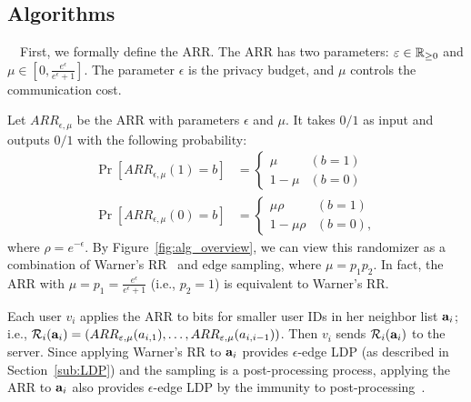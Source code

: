 \subsection{Algorithms}
\label{sub:three_algorithms}

\smallskip
{}~~First, we formally define the ARR.
The ARR has two parameters: $\varepsilon \in \mathbb{R}_{\ge0}$ and $\mu \in [0,\frac{e^{\epsilon}}{e^{\epsilon} + 1}]$.
The parameter $\epsilon$ is the privacy budget, and $\mu$ controls the communication cost.

Let
$ARR_{\epsilon,\mu}$ be the ARR with parameters $\epsilon$ and $\mu$. It takes $0/1$ as input and outputs $0/1$ with the following probability:
\begin{align}
    \Pr[ARR_{\epsilon,\mu}(1) = b] &= \begin{cases}\mu & (b=1) \\ 1-\mu & (b=0)\end{cases} \label{eq:ARR_1}\\
    \Pr[ARR_{\epsilon,\mu}(0) = b] &= \begin{cases}\mu\rho & (b=1) \\ 1-\mu \rho & (b=0), \end{cases} \label{eq:ARR_0}
\end{align}
where $\rho = e^{-\epsilon}$.
By Figure~\ref{fig:alg_overview},
we can view this randomizer as a combination of Warner's RR~\cite{Warner_JASA65}
and edge sampling, where $\mu=p_1 p_2$.
In fact, the ARR with $\mu = p_1 =\frac{e^{\epsilon}}{e^{\epsilon}+1}$ (i.e., $p_2=1$) is equivalent to Warner's RR.

Each user $v_i$ applies the ARR to bits for smaller user IDs in her neighbor list $\mathbf{a}_i$; i.e., $\mathcal{R}_i(\mathbf{a}_i) = (ARR_{\varepsilon,\mu}(a_{i,1}), \ldots, \allowbreak ARR_{\varepsilon,\mu}(a_{i,i-1}))$.
Then $v_i$ sends $\mathcal{R}_i(\mathbf{a}_i)$ to the server.
Since applying Warner's RR to $\mathbf{a}_i$ provides $\epsilon$-edge LDP (as described in Section~\ref{sub:LDP}) and the sampling is a post-processing process, applying the ARR to $\mathbf{a}_i$ also provides $\epsilon$-edge LDP by the immunity to post-processing~\cite{DP}.

